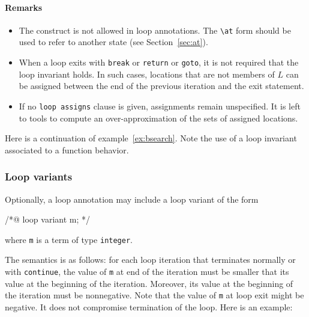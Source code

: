 \paragraph{Remarks}
\begin{itemize}
\item The \old{} construct is not allowed
  in loop annotations. The \lstinline|\at| form should be used to
  refer to another state (see Section~\ref{sec:at}).
\item When a loop exits with \lstinline{break} or \lstinline{return} or
  \lstinline{goto}, it is not required that the loop invariant holds.
  In such cases, locations that are not members of $L$ can be
  assigned between the end of the previous iteration and the exit statement.
\item If no \lstinline{loop assigns}
  clause is given, assignments remain unspecified.
  It is left to tools to compute an over-approximation of the sets
  of assigned locations.
\end{itemize}

\begin{example}
\label{ex:bsearch2}
Here is a continuation of example~\ref{ex:bsearch}. Note the use of
a loop invariant associated to a function behavior.


\end{example}

\subsubsection{Loop variants}\label{sec:loop-variant}

Optionally, a loop annotation may include a loop variant of the form
\begin{listing-nonumber}
/*@ loop variant m; */
\end{listing-nonumber}
where \lstinline|m| is a term of type \lstinline|integer|.

The semantics is as follows: for each loop iteration that terminates
normally or with \lstinline|continue|, the value of \lstinline|m| at end of the
iteration must be smaller that its value at the beginning of the
iteration. Moreover, its value at the beginning of the iteration
must be nonnegative. Note that the value of \lstinline|m| at loop exit might be
negative. It does not compromise termination of the
loop. Here is an example:

\begin{example}
  \hspace{0pt}
  \label{ex:loopvariant}
\end{example}


